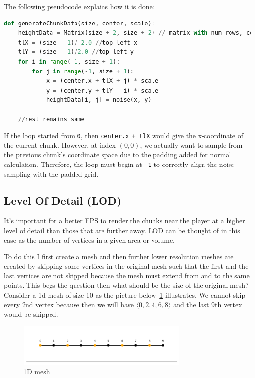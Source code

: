 The following pseudocode explains how it is done:
\begin{lstlisting}[language=Python]
def generateChunkData(size, center, scale):
	heightData = Matrix(size + 2, size + 2) // matrix with num rows, cols = size + 2
	tlX = (size - 1)/-2.0 //top left x
	tlY = (size - 1)/2.0 //top left y
	for i in range(-1, size + 1):
		for j in range(-1, size + 1):
			x = (center.x + tlX + j) * scale
			y = (center.y + tlY - i) * scale
			heightData[i, j] = noise(x, y)
	
	//rest remains same
\end{lstlisting}

If the loop started from \texttt{0}, then \texttt{center.x + tlX} would give the x-coordinate of the current chunk. However, at index $(0, 0)$, we actually want to sample from the previous chunk's coordinate space due to the padding added for normal calculation. Therefore, the loop must begin at \texttt{-1} to correctly align the noise sampling with the padded grid.

\subsection{Level Of Detail (LOD)}

It's important for a better FPS to render the chunks near the player at a higher level of detail than those that are further away. LOD can be thought of in this case as the number of vertices in a given area or volume.

To do this I first create a mesh and then further lower resolution meshes are created by skipping some vertices in the original mesh such that the first and the last vertices are not skipped because the mesh must extend from and to the same points. This begs the question then what should be the size of the original mesh? Consider a 1d mesh of size 10 as the picture below~\ref{fig:one_d} illustrates. We cannot skip every 2nd vertex because then we will have $\langle 0, 2, 4, 6, 8 \rangle$ and the last 9th vertex would be skipped.

\begin{figure}[H]
    \centering
    \includegraphics[width=0.75\textwidth]{images/one_d.png}
    \caption{1D mesh}
    \label{fig:one_d}
\end{figure}

